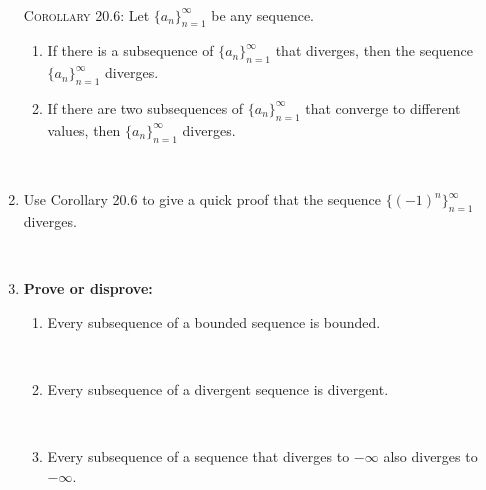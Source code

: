 \documentclass[12pt]{amsart}
\begin{document}
\begin{enumerate}
\

\noindent \textsc{Corollary 20.6:} Let $\{a_n\}_{n=1}^\infty$ be any sequence.
\begin{enumerate}
\item If there is a subsequence of $\{a_n\}_{n=1}^\infty$ that diverges, then the sequence $\{a_n\}_{n=1}^\infty$ diverges.
\item If there are two subsequences of $\{a_n\}_{n=1}^\infty$ that converge to different values, then $\{a_n\}_{n=1}^\infty$ diverges.
\end{enumerate}

\



\item Use Corollary 20.6 to give a quick proof that the sequence $\{ (-1)^n \}_{n=1}^\infty$ diverges.

\

\item \textbf{Prove or disprove:}
\begin{enumerate}
\item Every subsequence of a bounded sequence is bounded.

\

\item Every subsequence of a divergent sequence is divergent.

\

\item Every subsequence of a sequence that diverges to $-\infty$ also diverges to $-\infty$.




\end{enumerate}

\end{enumerate}
\end{document}
